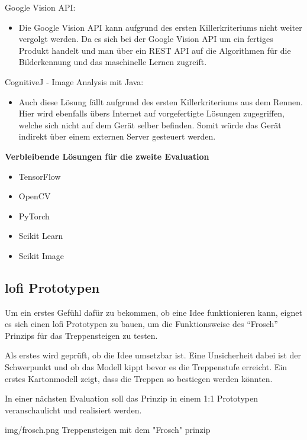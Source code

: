 Google Vision API:
\begin{itemize}
    \item Die Google Vision API kann aufgrund des ersten Killerkriteriums nicht weiter vergolgt werden. Da es sich bei der Google Vision API um ein fertiges Produkt handelt und man über ein REST API auf die Algorithmen für die Bilderkennung und das maschinelle Lernen zugreift.
\end{itemize}

CognitiveJ - Image Analysis mit Java:
\begin{itemize}
    \item Auch diese Lösung fällt aufgrund des ersten Killerkriteriums aus dem Rennen. Hier wird ebenfalls übers Internet auf vorgefertigte Lösungen zugegriffen, welche sich nicht auf dem Gerät selber befinden. Somit würde das Gerät indirekt über einem externen Server gesteuert werden.
\end{itemize}

\textbf{Verbleibende Lösungen für die zweite Evaluation}
\begin{itemize}
    \item TensorFlow 
    \item OpenCV
    \item PyTorch
    \item Scikit Learn
    \item Scikit Image
\end{itemize}

\subsection{\acrshort{lofi} Prototypen}

Um ein erstes Gefühl dafür zu bekommen, ob eine Idee funktionieren kann, eignet es 
sich einen \acrfull{lofi} Prototypen zu bauen, um die Funktionsweise
des ``Frosch'' Prinzips für das Treppensteigen zu testen.

Als erstes wird geprüft, ob die Idee umsetzbar ist.
Eine Unsicherheit dabei ist der Schwerpunkt und ob das Modell kippt
bevor es die Treppenstufe erreicht. Ein erstes Kartonmodell zeigt,
dass die Treppen so bestiegen werden könnten.

In einer nächsten Evaluation soll das Prinzip in einem 1:1 Prototypen veranschaulicht und realisiert werden.

\image
 {img/frosch.png}
 {Treppensteigen mit dem "Frosch" prinzip}
